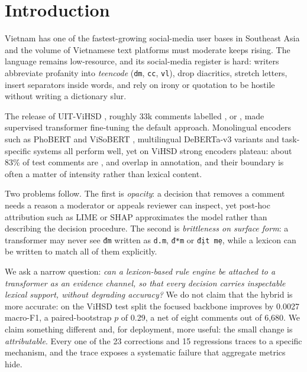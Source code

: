 \section{Introduction}
\label{sec:intro}

Vietnam has one of the fastest-growing social-media user bases in Southeast Asia and
the volume of Vietnamese text platforms must moderate keeps rising. The language
remains low-resource, and its social-media register is hard: writers abbreviate
profanity into \emph{teencode} (\texttt{dm}, \texttt{cc}, \texttt{vl}), drop
diacritics, stretch letters, insert separators inside words, and rely on irony or
quotation to be hostile without writing a dictionary slur.

The release of UIT-ViHSD \cite{luu2021vihsd}, roughly 33k comments labelled
\clean{}, \off{} or \hate{}, made supervised transformer fine-tuning the default
approach. Monolingual encoders such as PhoBERT \cite{nguyen2020phobert} and
ViSoBERT \cite{nguyen2023visobert}, multilingual DeBERTa-v3 variants
\cite{he2021deberta,he2023debertav3,liu2024mdeberta} and task-specific systems
\cite{nguyen2024vihatet5} all perform well, yet on ViHSD strong encoders plateau:
about 83\% of test comments are \clean{}, \hate{} and \off{} overlap in annotation,
and their boundary is often a matter of intensity rather than lexical content.

Two problems follow. The first is \emph{opacity}: a decision that removes a
comment needs a reason a moderator or appeals reviewer can inspect, yet post-hoc
attribution such as LIME \cite{ribeiro2016why} or SHAP \cite{lundberg2017shap}
approximates the model rather than describing the decision procedure. The second is
\emph{brittleness on surface form}: a transformer may never see \texttt{đm} written
as \texttt{d.m}, \texttt{đ*m} or \texttt{địt mẹ}, while a lexicon can be written to
match all of them explicitly.

We ask a narrow question: \emph{can a lexicon-based rule engine be attached to a
transformer as an evidence channel, so that every decision carries inspectable
lexical support, without degrading accuracy?} We do not claim that the hybrid is
more accurate: on the ViHSD test split the focused backbone improves by 0.0027
macro-F1, a paired-bootstrap $p$ of 0.29, a net of eight comments out of 6{,}680. We
claim something different and, for deployment, more useful: the small change is
\emph{attributable}. Every one of the 23 corrections and 15 regressions traces to a
specific mechanism, and the trace exposes a systematic failure that aggregate
metrics hide.

